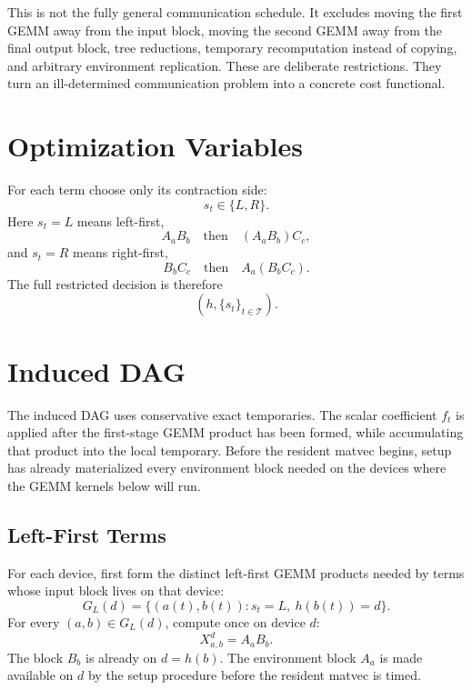 \documentclass[11pt]{article}
\begin{document}
This is not the fully general communication schedule.  It excludes moving the
first GEMM away from the input block, moving the second GEMM away from the final
output block, tree reductions, temporary recomputation instead of copying, and
arbitrary environment replication.  These are deliberate restrictions.  They
turn an ill-determined communication problem into a concrete cost functional.

\section{Optimization Variables}

For each term choose only its contraction side:
\begin{equation}
  s_t \in \{L,R\}.
\end{equation}
Here $s_t=L$ means left-first,
\begin{equation}
  A_aB_b \quad \text{then} \quad (A_aB_b)C_c,
\end{equation}
and $s_t=R$ means right-first,
\begin{equation}
  B_bC_c \quad \text{then} \quad A_a(B_bC_c).
\end{equation}
The full restricted decision is therefore
\begin{equation}
  (h,\{s_t\}_{t\in\mathcal{T}}).
\end{equation}

\section{Induced DAG}

The induced DAG uses conservative exact temporaries.  The scalar coefficient
$f_t$ is applied after the first-stage GEMM product has been formed, while
accumulating that product into the local temporary.
Before the resident matvec begins, setup has already materialized every
environment block needed on the devices where the GEMM kernels below will run.

\subsection{Left-First Terms}

For each device, first form the distinct left-first GEMM products needed by
terms whose input block lives on that device:
\begin{equation}
  G_L(d) =
    \{(a(t),b(t)) : s_t=L,\ h(b(t))=d\}.
\end{equation}
For every $(a,b)\in G_L(d)$, compute once on device $d$:
\begin{equation}
  X^d_{a,b} = A_a B_b .
\end{equation}
The block $B_b$ is already on $d=h(b)$.  The environment block $A_a$ is made
available on $d$ by the setup procedure before the resident matvec is timed.
\end{document}
